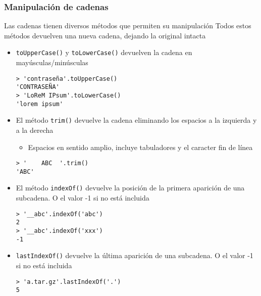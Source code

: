 \documentclass[ucs]{beamer}
\begin{document}
\begin{frame}[fragile]
\frametitle{Manipulación de cadenas}

Las cadenas tienen diversos métodos que permiten su manipulación
Todos estos métodos devuelven una nueva cadena, dejando la original
intacta

    \begin{itemize}
    \item
\verb|toUpperCase()|
y
\verb|toLowerCase()|
devuelven la cadena en mayúsculas/minúsculas

  \begin{scriptsize}
  \begin{verbatim}
> 'contraseña'.toUpperCase()
'CONTRASEÑA'
> 'LoReM IPsum'.toLowerCase()
'lorem ipsum'
  \end{verbatim}
  \end{scriptsize}

    \item
El método
\verb|trim()|
devuelve la cadena eliminando los espacios a la izquierda
y a la derecha

    \begin{itemize}
    \item
Espacios en sentido amplio, incluye tabuladores y el caracter
fin de línea
    \end{itemize}


  \begin{scriptsize}
  \begin{verbatim}
> '    ABC  '.trim()
'ABC'
  \end{verbatim}
  \end{scriptsize}

\end{itemize}

\end{frame}

\begin{frame}[fragile]

\begin{itemize}
    \item
El método 
\verb|indexOf()|
devuelve la posición de la primera aparición de una
subcadena. O el valor -1 si no está incluida

  \begin{scriptsize}
  \begin{verbatim}
> '__abc'.indexOf('abc')
2
> '__abc'.indexOf('xxx')
-1
  \end{verbatim}
  \end{scriptsize}

    \item
\verb|lastIndexOf()|
devuelve la última aparición de una subcadena. O el valor -1
si no está incluida
  \begin{scriptsize}
  \begin{verbatim}
> 'a.tar.gz'.lastIndexOf('.')
5
  \end{verbatim}
  \end{scriptsize}

    \end{itemize}

\end{frame}
\end{document}
